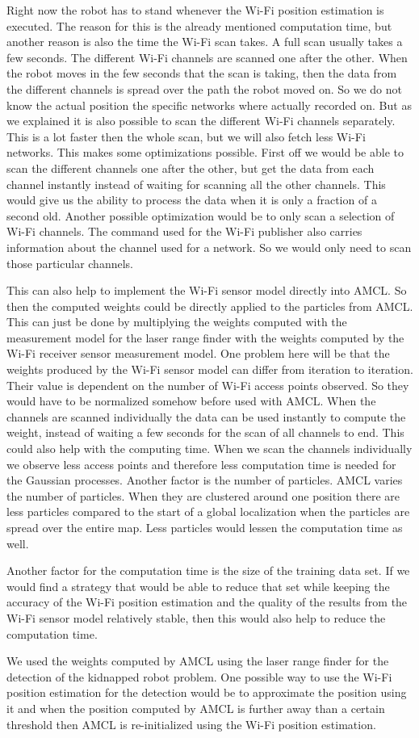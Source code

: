 Right now the robot has to stand whenever the Wi-Fi position estimation is executed. The reason for this is the already mentioned computation time, but another reason is also the time the Wi-Fi scan takes. A full scan usually takes a few seconds. The different Wi-Fi channels are scanned one after the other. When the robot moves in the few seconds that the scan is taking, then the data from the different channels is spread over the path the robot moved on. So we do not know the actual position the specific networks where actually recorded on. But as we explained it is also possible to scan the different Wi-Fi channels separately. This is a lot faster then the whole scan, but we will also fetch less Wi-Fi networks. This makes some optimizations possible. First off we would be able to scan the different channels one after the other, but get the data from each channel instantly instead of waiting for scanning all the other channels. This would give us the ability to process the data when it is only a fraction of a second old. Another possible optimization would be to only scan a selection of Wi-Fi channels. The command used for the Wi-Fi publisher also carries information about the channel used for a network. So we would only need to scan those particular channels.

This can also help to implement the Wi-Fi sensor model directly into AMCL. So then the computed weights could be directly applied to the particles from AMCL. This can just be done by multiplying the weights computed with the measurement model for the laser range finder with the weights computed by the Wi-Fi receiver sensor measurement model. One problem here will be that the weights produced by the Wi-Fi sensor model can differ from iteration to iteration. Their value is dependent on the number of Wi-Fi access points observed. So they would have to be normalized somehow before used with AMCL. When the channels are scanned individually the data can be used instantly to compute the weight, instead of waiting a few seconds for the scan of all channels to end. This could also help with the computing time. When we scan the channels individually we observe less access points and therefore less computation time is needed for the Gaussian processes. Another factor is the number of particles. AMCL varies the number of particles. When they are clustered around one position there are less particles compared to the start of a global localization when the particles are spread over the entire map. Less particles would lessen the computation time as well. 

Another factor for the computation time is the size of the training data set. If we would find a strategy that would be able to reduce that set while keeping the accuracy of the Wi-Fi position estimation and the quality of the results from the Wi-Fi sensor model relatively stable, then this would also help to reduce the computation time.

We used the weights computed by AMCL using the laser range finder for the detection of the kidnapped robot problem. One possible way to use the Wi-Fi position estimation for the detection would be to approximate the position using it and when the position computed by AMCL is further away than a certain threshold then AMCL is re-initialized using the Wi-Fi position estimation. 